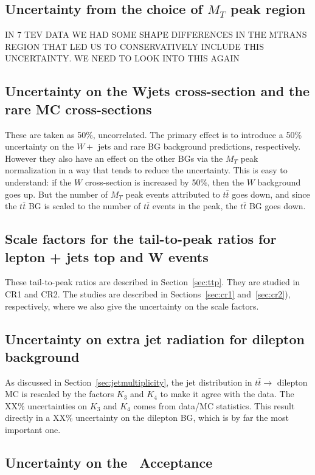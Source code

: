 \subsection{Uncertainty from the choice of $M_T$ peak region}
IN 7 TEV DATA WE HAD SOME SHAPE DIFFERENCES IN THE MTRANS REGION THAT 
LED US TO CONSERVATIVELY INCLUDE THIS UNCERTAINTY.  WE NEED TO LOOK
INTO THIS AGAIN

\subsection{Uncertainty on the Wjets cross-section and the rare MC cross-sections}
These are taken as 50\%, uncorrelated.  
The primary effect is to introduce a 50\%
uncertainty
on the $W +$ jets and rare BG 
background predictions, respectively.  However they also
have an effect on the other BGs via the $M_T$ peak normalization
in a way that tends to reduce the uncertainty.  This is easy
to understand: if the $W$ cross-section is increased by 50\%, then
the $W$ background goes up.  But the number of $M_T$ peak events 
attributed to $t\bar{t}$ goes down, and since the $t\bar{t}$ BG is
scaled to the number of $t\bar{t}$ events in the peak, the $t\bar{t}$ 
BG goes down.  

\subsection{Scale factors for the tail-to-peak ratios for lepton +
  jets top and W events}
These tail-to-peak ratios are described in Section~\ref{sec:ttp}.
They are studied in CR1 and CR2.  The studies are described
in Sections~\ref{sec:cr1} and~\ref{sec:cr2}), respectively, where 
we also give the uncertainty on the scale factors.

\subsection{Uncertainty on extra jet radiation for dilepton
  background}
As discussed in Section~\ref{sec:jetmultiplicity}, the 
jet distribution in
$t\bar{t} \to$
dilepton MC is rescaled by the factors $K_3$ and $K_4$ to make 
it agree with the data.  The XX\% uncertainties on $K_3$ and $K_4$
comes from data/MC statistics.  This  
result directly in a XX\% uncertainty on the dilepton BG, which is by far 
the most important one.


\subsection{Uncertainty on the \ttll\ Acceptance}

